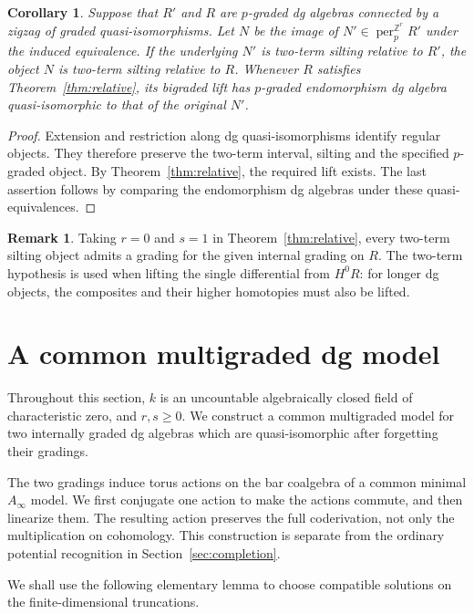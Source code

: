 \documentclass[12pt,a4paper,english,reqno]{amsart}
\theoremstyle{plain}
\newtheorem{cor}[thm]{Corollary}
\theoremstyle{definition}
\newtheorem{rmk}[thm]{Remark}
\numberwithin{equation}{section}
\newcommand{\thmref}[1]{Theorem~\ref{#1}}
\def\perf{\operatorname{per}}
\def\bbZ{{\mathbb Z}}
\def\Ainf{A_\infty}
\begin{document}
\begin{cor}\label{cor:replacement}
Suppose that $R'$ and $R$ are $p$-graded dg algebras connected by a zigzag of graded quasi-isomorphisms. Let $N$ be the image of $N'\in\perf^{\bbZ^r}_pR'$ under the induced equivalence. If the underlying $N'$ is two-term silting relative to $R'$, the object $N$ is two-term silting relative to $R$. Whenever $R$ satisfies \thmref{thm:relative}, its bigraded lift has $p$-graded endomorphism dg algebra quasi-isomorphic to that of the original $N'$.
\end{cor}
\begin{proof}
Extension and restriction along dg quasi-isomorphisms identify regular objects. They therefore preserve the two-term interval, silting and the specified $p$-graded object. By \thmref{thm:relative}, the required lift exists. The last assertion follows by comparing the endomorphism dg algebras under these quasi-equivalences.
\end{proof}

\begin{rmk}
Taking $r=0$ and $s=1$ in \thmref{thm:relative}, every two-term silting object admits a grading for the given internal grading on $R$. The two-term hypothesis is used when lifting the single differential from $H^0R$: for longer dg objects, the composites and their higher homotopies must also be lifted.
\end{rmk}

\section{A common multigraded dg model}\label{sec:common}
Throughout this section, $k$ is an uncountable algebraically closed field of characteristic zero, and $r,s\ge0$. We construct a common multigraded model for two internally graded dg algebras which are quasi-isomorphic after forgetting their gradings.

The two gradings induce torus actions on the bar coalgebra of a common minimal $\Ainf$ model. We first conjugate one action to make the actions commute, and then linearize them. The resulting action preserves the full coderivation, not only the multiplication on cohomology. This construction is separate from the ordinary potential recognition in Section~\ref{sec:completion}.

We shall use the following elementary lemma to choose compatible solutions on the finite-dimensional truncations.
\end{document}
